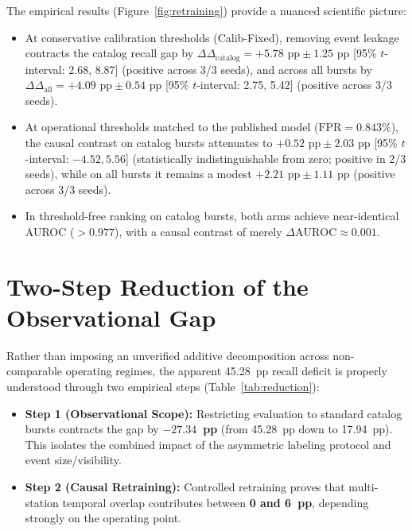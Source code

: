 \documentclass[11pt,a4paper]{article}
\begin{document}
The empirical results (Figure~\ref{fig:retraining}) provide a nuanced scientific picture:
\begin{itemize}
    \item At conservative calibration thresholds (Calib-Fixed), removing event leakage contracts the catalog recall gap by \textbf{$\Delta\Delta_{\text{catalog}} = +5.78\text{ pp} \pm 1.25\text{ pp}$} [95\% $t$-interval: 2.68, 8.87] (positive across 3/3 seeds), and across all bursts by \textbf{$\Delta\Delta_{\text{all}} = +4.09\text{ pp} \pm 0.54\text{ pp}$} [95\% $t$-interval: 2.75, 5.42] (positive across 3/3 seeds).
    \item At operational thresholds matched to the published model ($\text{FPR} = 0.843\%$), the causal contrast on catalog bursts attenuates to \textbf{$+0.52\text{ pp} \pm 2.03\text{ pp}$} [95\% $t$-interval: $-4.52, 5.56$] (statistically indistinguishable from zero; positive in 2/3 seeds), while on all bursts it remains a modest $+2.21\text{ pp} \pm 1.11\text{ pp}$ (positive across 3/3 seeds).
    \item In threshold-free ranking on catalog bursts, both arms achieve near-identical AUROC ($>0.977$), with a causal contrast of merely $\Delta\text{AUROC} \approx 0.001$.
\end{itemize}

\section{Two-Step Reduction of the Observational Gap}

Rather than imposing an unverified additive decomposition across non-comparable operating regimes, the apparent 45.28~pp recall deficit is properly understood through two empirical steps (Table~\ref{tab:reduction}):
\begin{itemize}
    \item \textbf{Step 1 (Observational Scope):} Restricting evaluation to standard catalog bursts contracts the gap by \textbf{$-27.34$~pp} (from 45.28~pp down to 17.94~pp). This isolates the combined impact of the asymmetric labeling protocol and event size/visibility.
    \item \textbf{Step 2 (Causal Retraining):} Controlled retraining proves that multi-station temporal overlap contributes between \textbf{0 and 6~pp}, depending strongly on the operating point.
\end{itemize}
\end{document}
